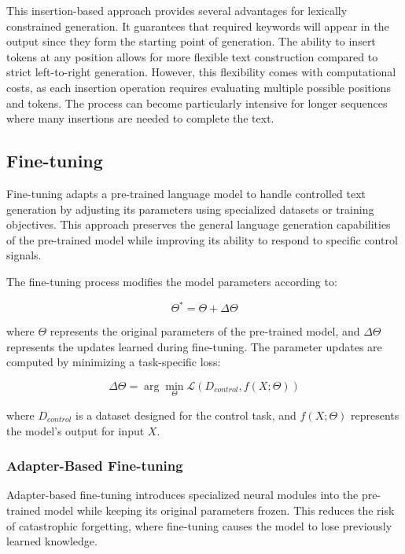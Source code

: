 This insertion-based approach provides several advantages for lexically constrained generation. It guarantees that required keywords will appear in the output since they form the starting point of generation. The ability to insert tokens at any position allows for more flexible text construction compared to strict left-to-right generation. However, this flexibility comes with computational costs, as each insertion operation requires evaluating multiple possible positions and tokens. The process can become particularly intensive for longer sequences where many insertions are needed to complete the text.

\subsection{Fine-tuning}

Fine-tuning adapts a pre-trained language model to handle controlled text generation by adjusting its parameters using specialized datasets or training objectives. 
This approach preserves the general language generation capabilities of the pre-trained model while improving its ability to respond to specific control signals.

The fine-tuning process modifies the model parameters according to:

\begin{equation}
    \Theta^* = \Theta + \Delta\Theta
\end{equation}

where $\Theta$ represents the original parameters of the pre-trained model, and $\Delta\Theta$ represents the updates learned during fine-tuning. The parameter updates are computed by minimizing a task-specific loss:

\begin{equation}
    \Delta\Theta = \arg\min_{\Theta} \mathcal{L}(D_{control}, f(X; \Theta))
\end{equation}

where $D_{control}$ is a dataset designed for the control task, and $f(X; \Theta)$ represents the model's output for input $X$.

\subsubsection{Adapter-Based Fine-tuning}

Adapter-based fine-tuning introduces specialized neural modules into the pre-trained model while keeping its original parameters frozen. This reduces the risk of catastrophic forgetting, where fine-tuning causes the model to lose previously learned knowledge.

